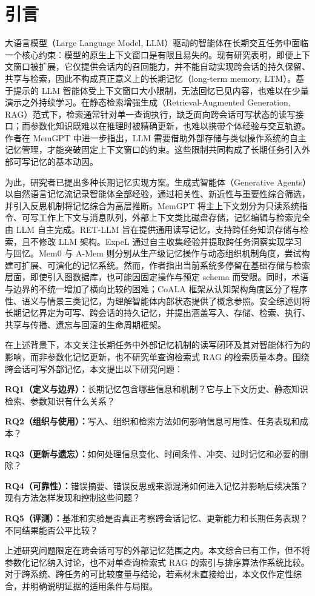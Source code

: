 \section{引言}

大语言模型（Large Language Model, LLM）驱动的智能体在长期交互任务中面临一个核心约束：模型的原生上下文窗口是有限且易失的。现有研究表明，即便上下文窗口被扩展，它仅提供会话内的召回能力，并不能自动实现跨会话的持久保留、共享与检索，因此不构成真正意义上的长期记忆（long-term memory, LTM）\cite{W0039}。基于提示的 LLM 智能体受上下文窗口大小限制，无法回忆已见内容，也难以在少量演示之外持续学习\cite{W0618}。在静态检索增强生成（Retrieval-Augmented Generation, RAG）范式下，检索通常针对单一查询执行，缺乏面向跨会话可写状态的读写接口；而参数化知识既难以在推理时被精确更新，也难以携带个体经验与交互轨迹。作者在 MemGPT 中进一步指出，LLM 需要借助外部存储与类似操作系统的自主记忆管理，才能突破固定上下文窗口的约束\cite{W0002}。这些限制共同构成了长期任务引入外部可写记忆的基本动因。

为此，研究者已提出多种长期记忆实现方案。生成式智能体（Generative Agents）以自然语言记忆流记录智能体全部经验，通过相关性、新近性与重要性综合筛选，并引入反思机制将记忆综合为高层推断\cite{W0001}。MemGPT 将主上下文划分为只读系统指令、可写工作上下文与消息队列，外部上下文类比磁盘存储，记忆编辑与检索完全由 LLM 自主完成\cite{W0002}。RET-LLM 旨在提供通用读写记忆，支持跨任务知识存储与检索，且不修改 LLM 架构\cite{W0680}。ExpeL 通过自主收集经验并提取跨任务洞察实现学习与回忆\cite{W0618}。Mem0 与 A-Mem 则分别从生产级记忆操作与动态组织机制角度，尝试构建可扩展、可演化的记忆系统\cite{W0682,W0681}。然而，作者指出当前系统多停留在基础存储与检索层面，即使引入图数据库，也可能因固定操作与预定 schema 而受限\cite{W0681}。同时，术语与边界的不统一增加了横向比较的困难；CoALA 框架从认知架构角度区分了程序性、语义与情景三类记忆，为理解智能体内部状态提供了概念参照\cite{W0140}。安全综述则将长期记忆界定为可写、跨会话的持久记忆，并提出涵盖写入、存储、检索、执行、共享与传播、遗忘与回滚的生命周期框架\cite{W0039}。

在上述背景下，本文关注长期任务中外部记忆机制的读写闭环及其对智能体行为的影响，而非参数化记忆更新，也不研究单查询检索式 RAG 的检索质量本身。围绕跨会话可写外部记忆，本文提出以下研究问题：

\textbf{RQ1（定义与边界）：}长期记忆包含哪些信息和机制？它与上下文历史、静态知识检索、参数知识有什么关系？

\textbf{RQ2（组织与使用）：}写入、组织和检索方法如何影响信息可用性、任务表现和成本？

\textbf{RQ3（更新与遗忘）：}如何处理信息变化、时间条件、冲突、过时记忆和必要的删除？

\textbf{RQ4（可靠性）：}错误摘要、错误反思或来源混淆如何进入记忆并影响后续决策？现有方法怎样发现和控制这些问题？

\textbf{RQ5（评测）：}基准和实验是否真正考察跨会话记忆、更新能力和长期任务表现？不同结果能否公平比较？

上述研究问题限定在跨会话可写的外部记忆范围之内。本文综合已有工作，但不将参数化记忆纳入讨论，也不对单查询检索式 RAG 的索引与排序算法作系统比较。对于跨系统、跨任务的可比较度量与结论，若素材未直接给出，本文仅作定性综合，并明确说明证据的适用条件与局限。
